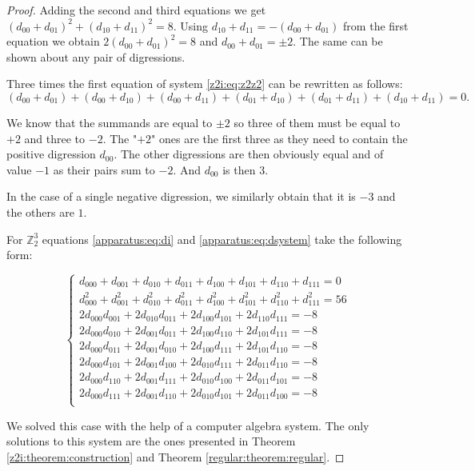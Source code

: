 \begin{proof}
    Adding the second and third equations we get $(d_{00}+d_{01})^2+(d_{10}+d_{11})^2=8$. Using $d_{10}+d_{11} = -(d_{00}+d_{01})$ from the first equation we obtain $2(d_{00}+d_{01})^2=8$ and $d_{00}+d_{01} = \pm 2$. The same can be shown about any pair of digressions.
    
    Three times the first equation of system \eqref{z2i:eq:z2z2} can be rewritten as follows:
    \begin{equation*}
        (d_{00}+d_{01}) + (d_{00}+d_{10}) + (d_{00}+d_{11}) + (d_{01}+d_{10}) + (d_{01}+d_{11}) + (d_{10}+d_{11}) = 0.
    \end{equation*}
    
    We know that the summands are equal to $\pm 2$ so three of them must be equal to $+2$ and three to $-2$. The "$+2$" ones are the first three as they need to contain the positive digression $d_{00}$. The other digressions are then obviously equal and of value $-1$ as their pairs sum to $-2$. And $d_{00}$ is then $3$.
    
    In the case of a single negative digression, we similarly obtain that it is $-3$ and the others are $1$.
    
    For $\mathbb Z_2^3$ equations \eqref{apparatus:eq:di} and \eqref{apparatus:eq:dsystem} take the following form:
    
    \begin{equation}
        \begin{cases}
            d_{000} + d_{001} + d_{010} + d_{011} + d_{100} + d_{101} + d_{110} + d_{111} = 0 \\
            d_{000}^2 + d_{001}^2 + d_{010}^2 + d_{011}^2 + d_{100}^2 + d_{101}^2 + d_{110}^2 + d_{111}^2 = 56 \\
            2 d_{000}d_{001} + 2 d_{010}d_{011} + 2 d_{100}d_{101} + 2 d_{110}d_{111} = -8 \\
            2 d_{000}d_{010} + 2 d_{001}d_{011} + 2 d_{100}d_{110} + 2 d_{101}d_{111} = -8 \\
            2 d_{000}d_{011} + 2 d_{001}d_{010} + 2 d_{100}d_{111} + 2 d_{101}d_{110} = -8 \\
            2 d_{000}d_{101} + 2 d_{001}d_{100} + 2 d_{010}d_{111} + 2 d_{011}d_{110} = -8 \\
            2 d_{000}d_{110} + 2 d_{001}d_{111} + 2 d_{010}d_{100} + 2 d_{011}d_{101} = -8 \\
            2 d_{000}d_{111} + 2 d_{001}d_{110} + 2 d_{010}d_{101} + 2 d_{011}d_{100} = -8 \\
        \end{cases}
    \end{equation}
    
    We solved this case with the help of a computer algebra system. The only solutions to this system are the ones presented in Theorem \ref{z2i:theorem:construction} and Theorem \ref{regular:theorem:regular}.
\end{proof}


